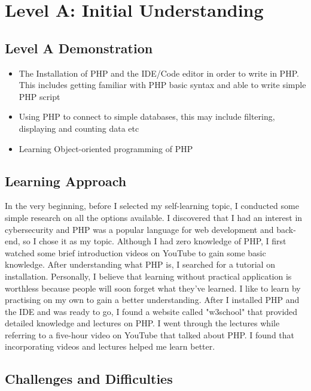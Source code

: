 \documentclass[a4paper, 11pt]{report}
\begin{document}
\section{Level A: Initial Understanding}
\vspace{5mm}
\subsection{Level A Demonstration}
\begin{itemize}
  \item The Installation of PHP and the IDE/Code editor in order to write in PHP. This includes getting familiar with PHP basic syntax and able to write simple PHP script
  \item Using PHP to connect to simple databases, this may include filtering, displaying and counting data etc
  \item Learning Object-oriented programming of PHP
\end{itemize}

\subsection{Learning Approach}

In the very beginning, before I selected my self-learning topic, I conducted some simple research on all the options available. I discovered that I had an interest in cybersecurity and PHP was a popular language for web development and back-end, so I chose it as my topic. Although I had zero knowledge of PHP, I first watched some brief introduction videos on YouTube to gain some basic knowledge. After understanding what PHP is, I searched for a tutorial on installation. Personally, I believe that learning without practical application is worthless because people will soon forget what they've learned. I like to learn by practising on my own to gain a better understanding. After I installed PHP and the IDE and was ready to go, I found a website called "w3school" that provided detailed knowledge and lectures on PHP. I went through the lectures while referring to a five-hour video on YouTube that talked about PHP. I found that incorporating videos and lectures helped me learn better.

\subsection{Challenges and Difficulties}
\end{document}

